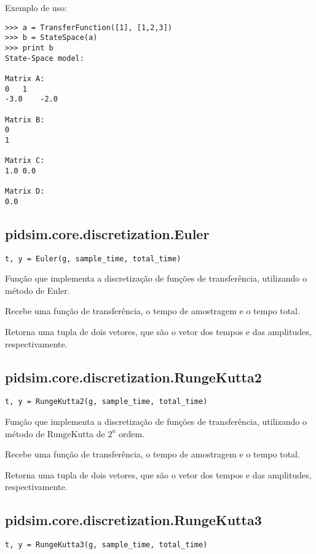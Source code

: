     Exemplo de uso:
    
    \begin{verbatim}
>>> a = TransferFunction([1], [1,2,3])
>>> b = StateSpace(a)
>>> print b
State-Space model:

Matrix A:
0   1   
-3.0    -2.0    

Matrix B:
0   
1   

Matrix C:
1.0 0.0 

Matrix D:
0.0\end{verbatim}

\subsection{pidsim.core.discretization.Euler}

    \begin{verbatim}
t, y = Euler(g, sample_time, total_time)\end{verbatim}

    Função que implementa a discretização de funções de transferência,
    utilizando o método de Euler.
    
    Recebe uma função de transferência, o tempo de amostragem e o tempo
    total.

    Retorna uma tupla de dois vetores, que são o vetor dos tempos e das amplitudes,
    respectivamente.

\subsection{pidsim.core.discretization.RungeKutta2}

    \begin{verbatim}
t, y = RungeKutta2(g, sample_time, total_time)\end{verbatim}
    
    Função que implementa a discretização de funções de transferência,
    utilizando o método de RungeKutta de $2^a$ ordem.
    
    Recebe uma função de transferência, o tempo de amostragem e o tempo
    total.
    
    Retorna uma tupla de dois vetores, que são o vetor dos tempos e das amplitudes,
    respectivamente.

\subsection{pidsim.core.discretization.RungeKutta3}

    \begin{verbatim}
t, y = RungeKutta3(g, sample_time, total_time)\end{verbatim}
    
